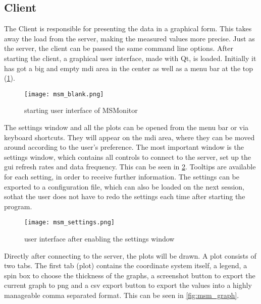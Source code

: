 \subsection{Client}
The Client is responsible for presenting the data in a graphical form. This takes away the load from the server, making the measured values more precise.\newline
Just as the server, the client can be passed the same command line options.\newline
After starting the client, a graphical user interface, made with Qt, is loaded. Initially it has got a big and empty mdi area in the center as well as a menu bar at the top (\ref{fig:msm_blank}).\newline
\begin{figure}[t!]
	\begin{center}
		\texttt{[image: msm\_blank.png]} 
		\caption{starting user interface of MSMonitor}
		\label{fig:msm_blank}
	\end{center}
\end{figure}
The settings window and all the plots can be opened from the menu bar or via keyboard shortcuts. They will appear on the mdi area, where they can be moved around according to the user's preference.\newline
The most important window is the settings window, which contains all controls to connect to the server, set up the gui refresh rates and data frequency. This can be seen in \ref{fig:msm_settings}. Tooltips are available for each setting, in order to receive further information.\newline
The settings can be exported to a configuration file, which can also be loaded on the next session, sothat the user does not have to redo the settings each time after starting the program.
\begin{figure}[t!]
	\begin{center}
		\texttt{[image: msm\_settings.png]} 
		\caption{user interface after enabling the settings window}
		\label{fig:msm_settings}
	\end{center}
\end{figure}
Directly after connecting to the server, the plots will be drawn.\newline 
A plot consists of two tabs. The first tab (plot) contains the coordinate system itself, a legend, a spin box to choose the thickness of the graphs, a screenshot button to export the current graph to png and a csv export button to export the values into a highly manageable comma separated format. This can be seen in \ref{fig:msm_graph}.
